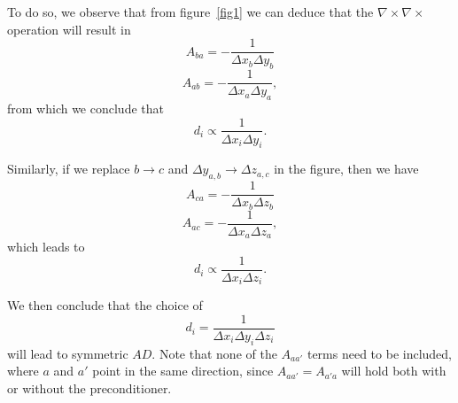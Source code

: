 \documentclass{article}
\newcommand{\BE}{\begin{equation}}
\newcommand{\EE}{\end{equation}}
\newcommand{\D}{\Delta}
\begin{document}
To do so, we observe that from figure~\ref{fig1} we can deduce that the
    $\nabla \times \nabla \times$ operation will result in
    \BE A_{ba} = -\frac{1}{\D x_b \D y_b} \EE
    \BE A_{ab} = -\frac{1}{\D x_a \D y_a}, \EE
    from which we conclude that
    \BE d_i \propto \frac{1}{\D x_i \D y_i}. \EE

Similarly, if we replace $b \to c$ and $\D y_{a,b} \to \D z_{a,c}$ 
    in the figure, then we have
    \BE A_{ca} = -\frac{1}{\D x_b \D z_b} \EE
    \BE A_{ac} = -\frac{1}{\D x_a \D z_a}, \EE
    which leads to
    \BE d_i \propto \frac{1}{\D x_i \D z_i}. \EE

We then conclude that the choice of 
    \BE d_i = \frac{1}{\D x_i \D y_i \D z_i} \EE
    will lead to symmetric $AD$.
Note that none of the $A_{aa'}$ terms need to be included,
    where $a$ and $a'$ point in the same direction,
    since $A_{aa'} = A_{a'a}$ will hold both with or without the preconditioner.
\end{document}
